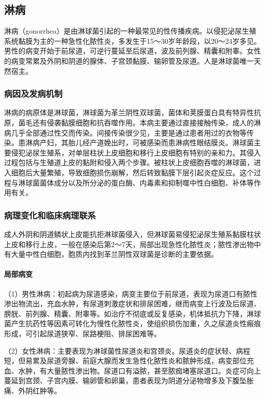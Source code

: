 \subsection{淋病}

淋病（gonorrhea）是由淋球菌引起的一种最常见的性传播疾病。以侵犯泌尿生殖系统黏膜为主的一种急性化脓性炎，多发生于15～30岁年龄段，以20～24岁多见。男性的病变开始于前尿道，可逆行蔓延至后尿道，波及前列腺、精囊和附睾。女性的病变常累及外阴和阴道的腺体、子宫颈黏膜、输卵管及尿道。人是淋球菌唯一天然宿主。

\subsubsection{病因及发病机制}

淋病的病原体是淋球菌，淋球菌为革兰阴性双球菌，菌体和荚膜蛋白具有特异性抗原，菌毛还有侵袭黏膜细胞和抗吞噬作用。本病主要通过直接接触传染，成人的淋病几乎全部通过性交而传染。间接传染很少见，主要是通过患者用过的衣物等传染。患淋病产妇，其胎儿经产道娩出时，可被感染而患淋病性眼结膜炎。淋球菌主要侵犯泌尿生殖系，对单层柱状上皮细胞和移行上皮细胞有特别的亲和力。其侵入过程包括与生殖道上皮的黏附和侵入两个步骤。被柱状上皮细胞吞噬的淋球菌，进入细胞后大量繁殖，导致细胞损伤崩解，然后转致黏膜下层引起炎症反应。这个过程与淋球菌菌体成分以及所分泌的蛋白酶、内毒素和抑制噬中性白细胞、补体等作用有关。

\subsubsection{病理变化和临床病理联系}

成人外阴和阴道鳞状上皮能抗拒淋球菌侵入，但淋球菌易侵犯泌尿生殖系黏膜柱状上皮和移行上皮，一般在感染后第2～7天，局部出现急性化脓性炎；脓性渗出物中有大量中性白细胞，胞质内找到革兰阴性双球菌是诊断的主要依据。

\paragraph{局部病变}
（1）男性淋病：初起病为尿道感染，病变主要位于前尿道，表现为尿道口有脓性渗出物流出，充血水肿，有尿道刺激症状和排尿困难，继而病变上行波及后尿道、膀胱、前列腺、精囊、附睾等。如治疗不彻底或反复感染，机体抵抗力下降，淋球菌产生抗药性等因素可转化为慢性化脓性炎，使组织损伤加重，久之尿道炎性瘢痕形成，可引起尿道狭窄、尿路梗阻、排尿困难等。

（2）女性淋病：主要表现为淋球菌性尿道炎和宫颈炎。尿道炎的症状轻、病程短，但易累及尿道旁腺、前庭大腺而发生急性化脓性炎和脓肿形成，病变部位充血、水肿，有大量脓性渗出物。尿道口有溢脓，甚至脓痂堵塞尿道口。炎症可向上蔓延到宫颈、子宫内膜、输卵管和卵巢，患者表现为阴道分泌物增多及下腹坠胀痛、外阴红肿等。

